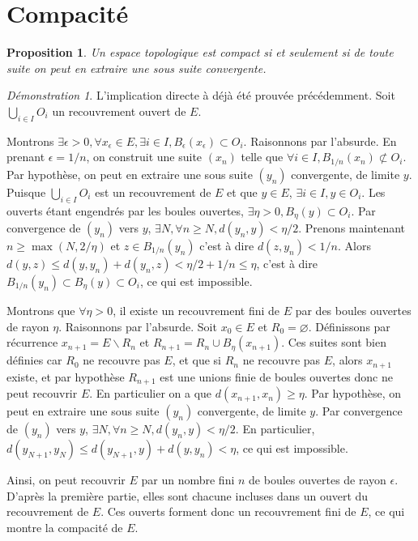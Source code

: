 \documentclass[a4paper, 11pt, french]{book}
\theoremstyle{plain} %
\newtheorem{proposition}{Proposition}
\theoremstyle{definition} %
\theoremstyle{remark} %
\newtheorem*{demonstration}{Démonstration}
\renewcommand{\setminus}{\backslash}
\newcommand{\1}{\mathds{1}}
\newcommand\vide{\varnothing}
\begin{document}
\section{Compacité}

\begin{proposition}
	Un espace topologique est compact si et seulement si de toute suite on peut en extraire une sous suite convergente.
\end{proposition}

\begin{demonstration}
	L'implication directe à déjà été prouvée précédemment.
	Soit $\bigcup_{i\in I}O_i$ un recouvrement ouvert de $E$.

	Montrons $\exists\epsilon>0, \forall x_\epsilon\in E, \exists i\in I, B_\epsilon(x_\epsilon)\subset O_i$.
	Raisonnons par l'absurde.
	En prenant $\epsilon=1/n$, on construit une suite $(x_n)$ telle que $\forall i\in I, B_{1/n}(x_n)\not\subset O_i$.
	Par hypothèse, on peut en extraire une sous suite $(y_n)$ convergente, de limite $y$.
	Puisque $\bigcup_{i\in I}O_i$ est un recouvrement de $E$ et que $y\in E$, $\exists i\in I, y\in O_i$.
	Les ouverts étant engendrés par les boules ouvertes, $\exists\eta>0, B_\eta(y)\subset O_i$.
	Par convergence de $(y_n)$ vers $y$, $\exists N, \forall n\geqslant N, d(y_n, y)<\eta/2$.
	Prenons maintenant $n\geqslant\max(N, 2/\eta)$ et $z\in B_{1/n}(y_n)$ c'est à dire $d(z, y_n)<1/n$.
	Alors $d(y, z)\leqslant d(y, y_n)+d(y_n, z)<\eta/2+1/n\leqslant\eta$, c'est à dire $B_{1/n}(y_n)\subset B_\eta(y)\subset O_i$, ce qui est impossible.

	Montrons que $\forall\eta>0$, il existe un recouvrement fini de $E$ par des boules ouvertes de rayon $\eta$.
	Raisonnons par l'absurde.
	Soit $x_0\in E$ et $R_0=\vide$.
	Définissons par récurrence $x_{n+1}=E\setminus R_n$ et $R_{n+1}=R_n\cup B_\eta(x_{n+1})$.
	Ces suites sont bien définies car $R_0$ ne recouvre pas $E$, et que si $R_n$ ne recouvre pas $E$, alors $x_{n+1}$ existe, et par hypothèse $R_{n+1}$ est une unions finie de boules ouvertes donc ne peut recouvrir $E$.
	En particulier on a que $d(x_{n+1}, x_n)\geqslant\eta$.
	Par hypothèse, on peut en extraire une sous suite $(y_n)$ convergente, de limite $y$.
	Par convergence de $(y_n)$ vers $y$, $\exists N, \forall n\geqslant N, d(y_n, y)<\eta/2$.
	En particulier, $d(y_{N+1}, y_N)\leqslant d(y_{N+1}, y)+d(y, y_n)<\eta$, ce qui est impossible.

	Ainsi, on peut recouvrir $E$ par un nombre fini $n$ de boules ouvertes de rayon $\epsilon$.
	D'après la première partie, elles sont chacune incluses dans un ouvert du recouvrement de $E$.
	Ces ouverts forment donc un recouvrement fini de $E$, ce qui montre la compacité de $E$.
\end{demonstration}
\end{document}
